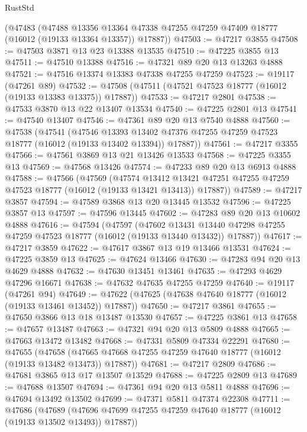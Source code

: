 \begin{lexlean}{RustStd}
\begin{coremodule}
    (@47483
      (@47488
        @13356
        @13364
        @47338
        @47255
        @47259
        @47409
        @18777
        (@16012 (@19133 @13364 @13357))
        @17887))
@47503 := @47217 @3855
@47508 := @47503 @3871 @13 @23 @13388 @13535
@47510 := @47225 @3855 @13
@47511 := @47510 @13388
@47516 := @47321 @89 @20 @13 @13263 @4888
@47521 := @47516 @13374 @13383 @47338 @47255 @47259
@47523 := @19117 (@47261 @89)
@47532 := @47508 (@47511 (@47521 @47523 @18777 (@16012 (@19133 @13383 @13375)) @17887))
@47533 := @47217 @2801
@47538 := @47533 @3870 @13 @22 @13407 @13534
@47540 := @47225 @2801 @13
@47541 := @47540 @13407
@47546 := @47361 @89 @20 @13 @7540 @4888
@47560 := @47538
    (@47541
      (@47546
        @13393
        @13402
        @47376
        @47255
        @47259
        @47523
        @18777
        (@16012 (@19133 @13402 @13394))
        @17887))
@47561 := @47217 @3355
@47566 := @47561 @3869 @13 @21 @13426 @13533
@47568 := @47225 @3355 @13
@47569 := @47568 @13426
@47574 := @47233 @89 @20 @13 @6913 @4888
@47588 := @47566
    (@47569
      (@47574
        @13412
        @13421
        @47251
        @47255
        @47259
        @47523
        @18777
        (@16012 (@19133 @13421 @13413))
        @17887))
@47589 := @47217 @3857
@47594 := @47589 @3868 @13 @20 @13445 @13532
@47596 := @47225 @3857 @13
@47597 := @47596 @13445
@47602 := @47283 @89 @20 @13 @10602 @4888
@47616 := @47594
    (@47597
      (@47602
        @13431
        @13440
        @47298
        @47255
        @47259
        @47523
        @18777
        (@16012 (@19133 @13440 @13432))
        @17887))
@47617 := @47217 @3859
@47622 := @47617 @3867 @13 @19 @13466 @13531
@47624 := @47225 @3859 @13
@47625 := @47624 @13466
@47630 := @47283 @94 @20 @13 @4629 @4888
@47632 := @47630 @13451 @13461
@47635 := @47293 @4629 @47296 @16671
@47638 := @47632 @47635 @47255 @47259
@47640 := @19117 (@47261 @94)
@47649 := @47622 (@47625 (@47638 @47640 @18777 (@16012 (@19133 @13461 @13452)) @17887))
@47650 := @47217 @3861
@47655 := @47650 @3866 @13 @18 @13487 @13530
@47657 := @47225 @3861 @13
@47658 := @47657 @13487
@47663 := @47321 @94 @20 @13 @5809 @4888
@47665 := @47663 @13472 @13482
@47668 := @47331 @5809 @47334 @22291
@47680 := @47655
    (@47658 (@47665 @47668 @47255 @47259 @47640 @18777 (@16012 (@19133 @13482 @13473)) @17887))
@47681 := @47217 @2809
@47686 := @47681 @3865 @13 @17 @13507 @13529
@47688 := @47225 @2809 @13
@47689 := @47688 @13507
@47694 := @47361 @94 @20 @13 @5811 @4888
@47696 := @47694 @13492 @13502
@47699 := @47371 @5811 @47374 @22308
@47711 := @47686
    (@47689 (@47696 @47699 @47255 @47259 @47640 @18777 (@16012 (@19133 @13502 @13493)) @17887))

\end{coremodule}
\end{lexlean}
